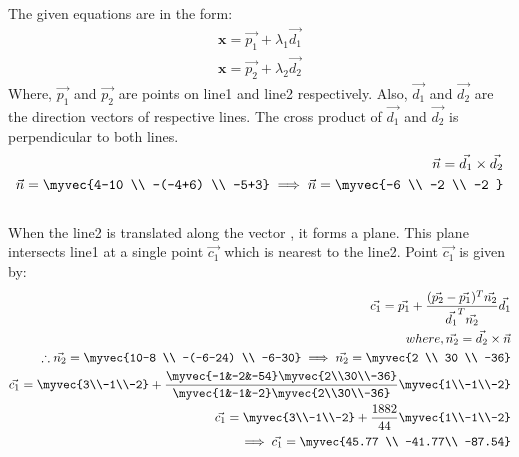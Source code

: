 \documentclass[journal,12pt,twocolumn]{IEEEtran}
\begin{document}
The given equations are in the form:
\begin{align}
    \textbf{x}=\vec{p_1} + \lambda_1\vec{d_1}\\
    \textbf{x}=\vec{p_2} + \lambda_2\vec{d_2}
\end{align}
Where, $\vec{p_1}$ and $\vec{p_2}$ are points on line1 and line2 respectively. Also, $\vec{d_1}$ and $\vec{d_2}$ are the direction vectors of respective lines.
The cross product of $\vec{d_1}$ and $\vec{d_2}$ is perpendicular to both lines.
\begin{align}
    \vec{n} = \vec{d_1} \times \vec{d_2}\\
    \vec{n}=\myvec{4-10 \\ -(-4+6) \\ -5+3}
     \implies \vec{n}=\myvec{-6 \\ -2 \\ -2 }
\end{align}
\\
When the line2 is translated along the vector , it forms a plane. This plane intersects line1 at a single point $\vec{c_1}$ which is nearest to the line2. Point $\vec{c_1}$ is given by:
\\
\begin{align}
\vec{c_1}=\vec{p_1}+\frac{(\vec{p_2}-\vec{p_1})^T \vec{n_2}}{\vec{d_1}^T \vec{n_2}}\vec{d_1} \\
where, \vec{n_2}=\vec{d_2}\times \vec{n}\\
 \therefore \vec{n_2}=\myvec{10-8 \\ -(-6-24) \\ -6-30}
\implies \vec{n_2}=\myvec{2 \\ 30 \\ -36}\\
\vec{c_1}= \myvec{3\\-1\\-2}+\frac{\myvec{-1&-2&-54} \myvec{2\\30\\-36}}{\myvec{1&-1&-2} \myvec{2\\30\\-36}}\myvec{1\\-1\\-2}\\
\vec{c_1}= \myvec{3\\-1\\-2}+\frac{1882}{44}\myvec{1\\-1\\-2}\\
\implies \vec{c_1}=\myvec{45.77 \\ -41.77\\ -87.54}
\end{align}
\end{document}
